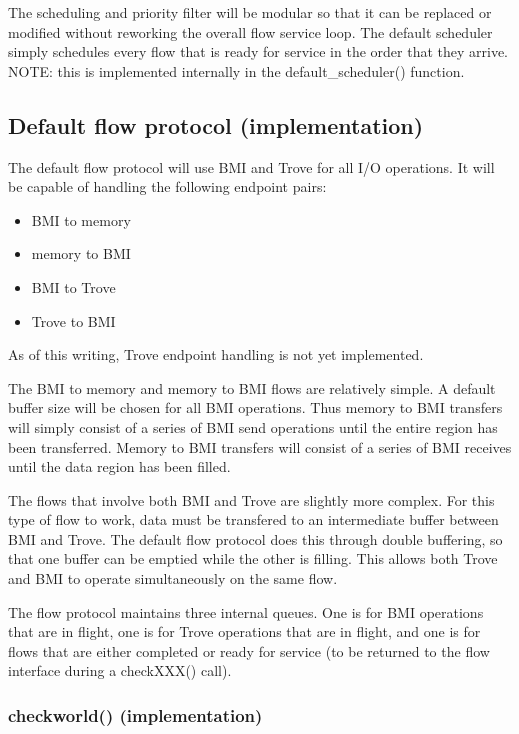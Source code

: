 \documentclass[12pt]{article} %
\begin{document}
The scheduling and priority filter will be modular so that it can be
replaced or modified without reworking the overall flow service loop.
The default scheduler simply schedules every flow that is ready
for service in the order that they arrive.  NOTE: this is
implemented internally in the default\_scheduler() function.

\subsection{Default flow protocol (implementation)}

The default flow protocol will use BMI and Trove for all I/O
operations.  It will be capable of handling the following endpoint
pairs:

\begin{itemize}
\item BMI to memory 
\item memory to BMI
\item BMI to Trove
\item Trove to BMI
\end{itemize}

As of this writing, Trove endpoint handling is not yet
implemented.

The BMI to memory and memory to BMI flows are relatively simple.
A default buffer size will be chosen for all BMI operations.  Thus
memory to BMI transfers will simply consist of a series of BMI
send operations until the entire region has been transferred.
Memory to BMI transfers will consist of a series of BMI receives
until the data region has been filled.

The flows that involve both BMI and Trove are slightly more
complex.  For this type of flow to work, data must be transfered
to an intermediate buffer between BMI and Trove.  The default flow
protocol does this through double buffering, so that one buffer
can be emptied while the other is filling.  This allows both Trove
and BMI to operate simultaneously on the same flow.

The flow protocol maintains three internal queues.  One is for BMI
operations that are in flight, one is for Trove operations that
are in flight, and one is for flows that are either completed or
ready for service (to be returned to the flow interface during a
checkXXX() call).

\subsubsection{checkworld() (implementation)}
\end{document}
